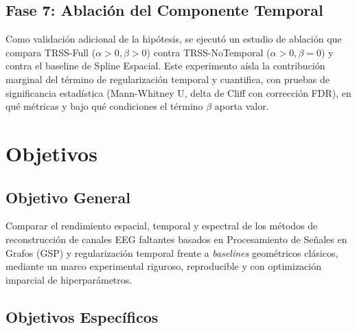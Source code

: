 \subsection{Fase 7: Ablación del Componente Temporal}

Como validación adicional de la hipótesis, se ejecutó un estudio de ablación que compara TRSS-Full ($\alpha > 0, \beta > 0$) contra TRSS-NoTemporal ($\alpha > 0, \beta = 0$) y contra el baseline de Spline Espacial. Este experimento aísla la contribución marginal del término de regularización temporal y cuantifica, con pruebas de significancia estadística (Mann-Whitney U, delta de Cliff con corrección FDR), en qué métricas y bajo qué condiciones el término $\beta$ aporta valor.

\section{Objetivos}

\subsection{Objetivo General}

Comparar el rendimiento espacial, temporal y espectral de los métodos de reconstrucción de canales EEG faltantes basados en Procesamiento de Señales en Grafos (GSP) y regularización temporal frente a \textit{baselines} geométricos clásicos, mediante un marco experimental riguroso, reproducible y con optimización imparcial de hiperparámetros.

\subsection{Objetivos Específicos}

